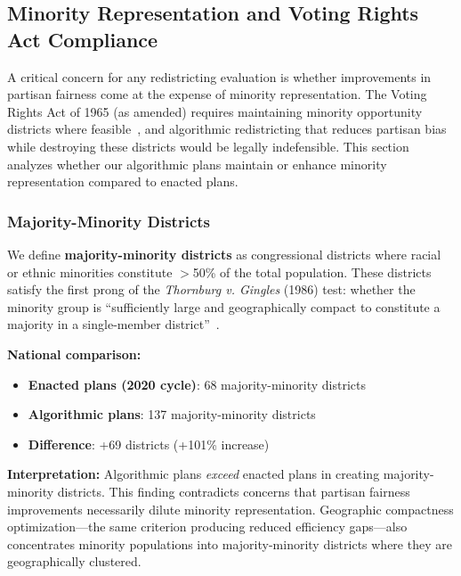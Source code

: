 \subsection{Minority Representation and Voting Rights Act Compliance}
\label{sec:vra-compliance}

A critical concern for any redistricting evaluation is whether improvements in partisan fairness come at the expense of minority representation. The Voting Rights Act of 1965 (as amended) requires maintaining minority opportunity districts where feasible~\cite{grofman1992voting}, and algorithmic redistricting that reduces partisan bias while destroying these districts would be legally indefensible. This section analyzes whether our algorithmic plans maintain or enhance minority representation compared to enacted plans.

\subsubsection{Majority-Minority Districts}

We define \textbf{majority-minority districts} as congressional districts where racial or ethnic minorities constitute $>$50\% of the total population. These districts satisfy the first prong of the \emph{Thornburg v. Gingles} (1986) test: whether the minority group is ``sufficiently large and geographically compact to constitute a majority in a single-member district''~\cite{grofman1992voting}.

\textbf{National comparison:}
\begin{itemize}
    \item \textbf{Enacted plans (2020 cycle)}: 68 majority-minority districts
    \item \textbf{Algorithmic plans}: 137 majority-minority districts
    \item \textbf{Difference}: +69 districts (+101\% increase)
\end{itemize}

\textbf{Interpretation:} Algorithmic plans \emph{exceed} enacted plans in creating majority-minority districts. This finding contradicts concerns that partisan fairness improvements necessarily dilute minority representation. Geographic compactness optimization---the same criterion producing reduced efficiency gaps---also concentrates minority populations into majority-minority districts where they are geographically clustered.

